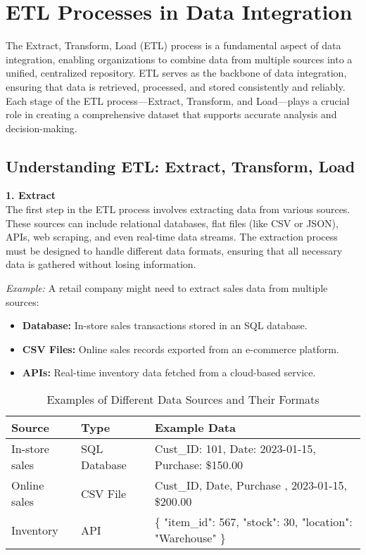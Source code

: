 \documentclass[12pt]{article}
\begin{document}
\section{ETL Processes in Data Integration}
The Extract, Transform, Load (ETL) process is a fundamental aspect of data integration, enabling organizations to combine data from multiple sources into a unified, centralized repository. ETL serves as the backbone of data integration, ensuring that data is retrieved, processed, and stored consistently and reliably. Each stage of the ETL process—Extract, Transform, and Load—plays a crucial role in creating a comprehensive dataset that supports accurate analysis and decision-making.

\subsection{Understanding ETL: Extract, Transform, Load}
\textbf{1. Extract} \\
The first step in the ETL process involves extracting data from various sources. These sources can include relational databases, flat files (like CSV or JSON), APIs, web scraping, and even real-time data streams. The extraction process must be designed to handle different data formats, ensuring that all necessary data is gathered without losing information.

\textit{Example:} A retail company might need to extract sales data from multiple sources:
\begin{itemize}
    \item \textbf{Database:} In-store sales transactions stored in an SQL database.
    \item \textbf{CSV Files:} Online sales records exported from an e-commerce platform.
    \item \textbf{APIs:} Real-time inventory data fetched from a cloud-based service.
\end{itemize}

\begin{table}[h]
    \centering
    \begin{tabular}{|p{4cm}|p{4cm}|p{6cm}|}
        \hline
        \textbf{Source} & \textbf{Type} & \textbf{Example Data} \\ \hline
        In-store sales & SQL Database & Cust\_ID: 101, Date: 2023-01-15, Purchase: \$150.00 \\ \hline
        Online sales & CSV File & Cust\_ID, Date, Purchase \newline 102, 2023-01-15, \$200.00 \\ \hline
        Inventory & API & \{ "item\_id": 567, "stock": 30, "location": "Warehouse" \} \\ \hline
    \end{tabular}
    \caption{Examples of Different Data Sources and Their Formats}
\end{table}
\end{document}
